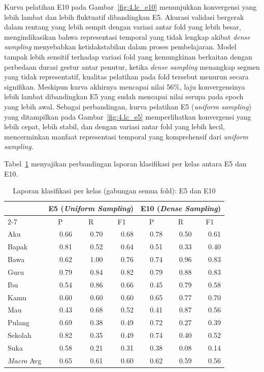 Kurva pelatihan E10 pada Gambar~\ref{fig:4.lc_e10} menunjukkan konvergensi yang lebih lambat dan lebih fluktuatif dibandingkan E5. Akurasi validasi bergerak dalam rentang yang lebih sempit dengan variasi antar fold yang lebih besar, mengindikasikan bahwa representasi temporal yang tidak lengkap akibat \textit{dense sampling} menyebabkan ketidakstabilan dalam proses pembelajaran. Model tampak lebih sensitif terhadap variasi fold yang kemungkinan berkaitan dengan perbedaan durasi gestur antar penutur, ketika \textit{dense sampling} menangkap segmen yang tidak representatif, kualitas pelatihan pada fold tersebut menurun secara signifikan. Meskipun kurva akhirnya mencapai nilai 56\%, laju konvergensinya lebih lambat dibandingkan E5 yang sudah mencapai nilai serupa pada epoch yang lebih awal. Sebagai perbandingan, kurva pelatihan E5 (\textit{uniform sampling}) yang ditampilkan pada Gambar~\ref{fig:4.lc_e5} memperlihatkan konvergensi yang lebih cepat, lebih stabil, dan dengan variasi antar fold yang lebih kecil, mencerminkan manfaat representasi temporal yang komprehensif dari \textit{uniform sampling}.\par

Tabel~\ref{tab:4.s4_perkelas} menyajikan perbandingan laporan klasifikasi per kelas antara E5 dan E10.\par

\begin{table}[H]
\centering
\caption{Laporan klasifikasi per kelas (gabungan semua fold): E5 dan E10}
\label{tab:4.s4_perkelas}
{\setlength{\tabcolsep}{3pt}
\footnotesize
\begin{tabular}{|l|rrr|rrr|}
\hline
\rowcolor{gray!15}\cellcolor{gray!15}\multirow{2}{*}{\textbf{Kelas}} &
  \multicolumn{3}{c|}{E5 (\textit{Uniform Sampling})} &
  \multicolumn{3}{c|}{E10 (\textit{Dense Sampling})} \\
\cline{2-7}
 & \multicolumn{1}{c|}{P} & \multicolumn{1}{c|}{R} & \multicolumn{1}{c|}{F1} & \multicolumn{1}{c|}{P} & \multicolumn{1}{c|}{R} & \multicolumn{1}{c|}{F1} \\
\hline
Aku     & 0.66 & 0.70 & 0.68 & 0.78 & 0.50 & 0.61 \\
Bapak   & 0.81 & 0.52 & 0.64 & 0.51 & 0.33 & 0.40 \\
Bawa    & 0.62 & 1.00 & 0.76 & 0.74 & 0.96 & 0.83 \\
Guru    & 0.79 & 0.84 & 0.82 & 0.79 & 0.88 & 0.83 \\
Ibu     & 0.54 & 0.86 & 0.66 & 0.45 & 0.79 & 0.58 \\
Kamu    & 0.60 & 0.60 & 0.60 & 0.65 & 0.77 & 0.70 \\
Mau     & 0.43 & 0.68 & 0.52 & 0.41 & 0.87 & 0.56 \\
Pulang  & 0.69 & 0.38 & 0.49 & 0.72 & 0.27 & 0.39 \\
Sekolah & 0.82 & 0.35 & 0.49 & 0.74 & 0.40 & 0.52 \\
Suka    & 0.58 & 0.21 & 0.31 & 0.38 & 0.08 & 0.14 \\
\hline
\textit{Macro} Avg & 0.65 & 0.61 & 0.60 & 0.62 & 0.59 & 0.56 \\
\hline
\end{tabular}
}
\end{table}

